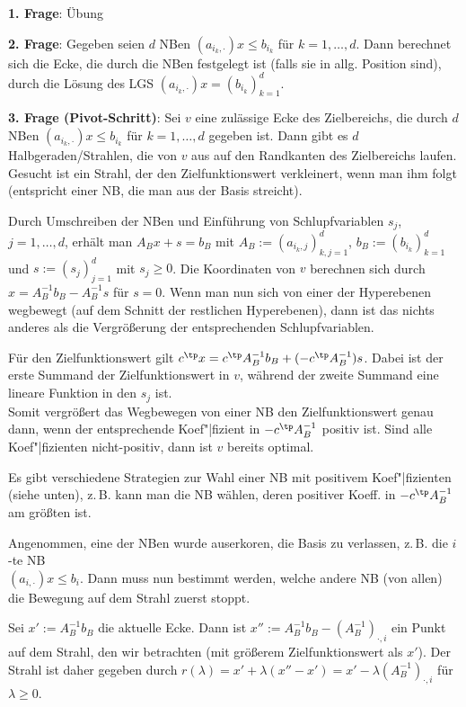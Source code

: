 \linie

\textbf{1. Frage}:
Übung

\linie

\textbf{2. Frage}:
Gegeben seien $d$ NBen
$(a_{i_k,\cdot}) x \le b_{i_k}$ für $k = 1, \dotsc, d$.
Dann berechnet sich die Ecke, die durch die NBen festgelegt ist
(falls sie in allg. Position sind), durch die Lösung des LGS
$(a_{i_k,\cdot}) x = (b_{i_k})_{k=1}^d$.

\linie

\textbf{3. Frage (Pivot-Schritt)}:
Sei $v$ eine zulässige Ecke des Zielbereichs, die durch $d$ NBen
$(a_{i_k,\cdot}) x \le b_{i_k}$ für $k = 1, \dotsc, d$ gegeben ist.
Dann gibt es $d$ Halbgeraden/Strahlen, die von $v$ aus auf den Randkanten des Zielbereichs laufen.
Gesucht ist ein Strahl, der den Zielfunktionswert verkleinert, wenn man ihm folgt
(entspricht einer NB, die man aus der Basis streicht).

Durch Umschreiben der NBen und Einführung von Schlupfvariablen $s_j$, $j = 1, \dotsc, d$,
erhält man $A_B x + s = b_B$ mit $A_B := (a_{i_k,j})_{k,j=1}^d$, $b_B := (b_{i_k})_{k=1}^d$ und
$s := (s_j)_{j=1}^d$ mit $s_j \ge 0$.
Die Koordinaten von $v$ berechnen sich durch $x = A_B^{-1} b_B - A_B^{-1} s$ für $s = 0$.
Wenn man nun sich von einer der Hyperebenen wegbewegt (auf dem Schnitt der restlichen Hyperebenen),
dann ist das nichts anderes als die Vergrößerung der entsprechenden Schlupfvariablen.

Für den Zielfunktionswert gilt $c^\tp x = c^\tp A_B^{-1} b_B + (-c^\tp A_B^{-1}) s$.
Dabei ist der erste Summand der Zielfunktionswert in $v$, während der zweite Summand eine
lineare Funktion in den $s_j$ ist.\\
Somit vergrößert das Wegbewegen von einer NB den Zielfunktionswert genau dann, wenn
der entsprechende Koef"|fizient in $-c^\tp A_B^{-1}$ positiv ist.
Sind alle Koef"|fizienten nicht-positiv, dann ist $v$ bereits optimal.

Es gibt verschiedene Strategien zur Wahl einer NB mit positivem Koef"|fizienten (siehe unten),
z.\,B. kann man die NB wählen, deren positiver Koeff. in $-c^\tp A_B^{-1}$ am größten ist.

\linie

Angenommen, eine der NBen wurde auserkoren, die Basis zu verlassen,
z.\,B. die $i$-te NB\\
$(a_{i,\cdot}) x \le b_i$.
Dann muss nun bestimmt werden, welche andere NB (von allen) die Bewegung auf dem Strahl zuerst
stoppt.

Sei $x' := A_B^{-1} b_B$ die aktuelle Ecke.
Dann ist $x'' := A_B^{-1} b_B - (A_B^{-1})_{\cdot,i}$ ein Punkt auf dem Strahl,
den wir betrachten (mit größerem Zielfunktionswert als $x'$).
Der Strahl ist daher gegeben durch
$r(\lambda) = x' + \lambda (x'' - x') = x' - \lambda (A_B^{-1})_{\cdot,i}$
für $\lambda \ge 0$.

